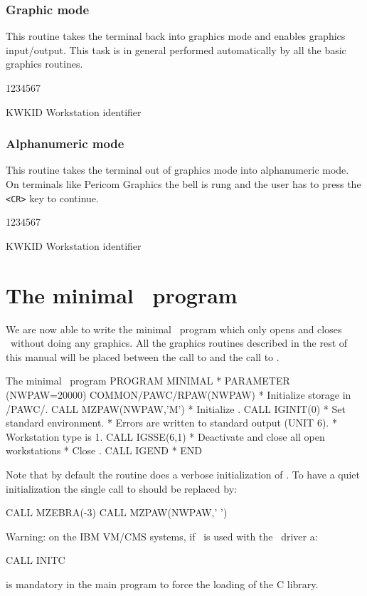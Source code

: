 \begin{minipage}[t]{.49\textwidth}
\subsubsection*{Graphic mode}
\Action
This routine takes the terminal back into graphics mode and e\-na\-bles
gra\-phics in\-put/out\-put. This task is in general performed automatically by
all the basic graphics routines.
\Pdesc
\begin{DLtt}{1234567}
\item[KWKID] Workstation identifier
\end{DLtt}
\end{minipage}
\hfill
\begin{minipage}[t]{.49\textwidth} 
\subsubsection{Alphanumeric mode}
\Action
This routine takes the terminal out of graphics mode into alphanumeric mode. On 
terminals like Pericom Graphics the bell is rung and the user has to press the 
{\tt <CR>} key to continue.
\Pdesc
\begin{DLtt}{1234567}
\item[KWKID] Workstation identifier
\end{DLtt}
\end{minipage}
 
\section{The minimal \HIGZ~program}
We are now able to write the minimal \HIGZ~program which only opens and closes
\HIGZ~without doing any graphics. All the graphics routines described in the
rest of this manual will be placed between the call to  and the
call to .
\begin{XMPt}{The minimal \HIGZ~program}
      PROGRAM MINIMAL
*
      PARAMETER (NWPAW=20000)
      COMMON/PAWC/RPAW(NWPAW)
*                                Initialize storage in /PAWC/.
      CALL MZPAW(NWPAW,'M')
*                                Initialize \HIGZ.
      CALL IGINIT(0)
*                                Set standard environment.
*                                Errors are written to standard output (UNIT 6).
*                                Workstation type is 1.
      CALL IGSSE(6,1)
*                                Deactivate and close all open workstations 
*                                Close \HIGZ.
      CALL IGEND
*
      END
\end{XMPt}
Note that by default the  routine does a verbose initialization of
\ZEBRA. 
To have a quiet initialization the single call to  should be replaced by:

\begin{XMP}
      CALL MZEBRA(-3)
      CALL MZPAW(NWPAW,' ')
\end{XMP}

Warning: on the IBM VM/CMS systems, if \HIGZ~is used with the ~driver a: 

\begin{XMP}
      CALL INITC
\end{XMP}

is mandatory in the main program to force the loading of the C library.
